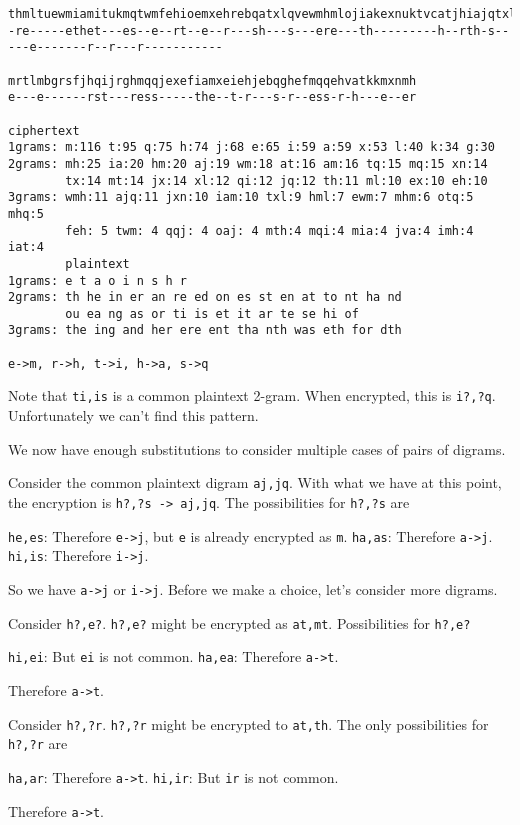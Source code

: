 \begin{Verbatim}[frame=single,fontsize=\tiny]
thmltuewmiamitukmqtwmfehioemxehrebqatxlqvewmhmlojiakexnuktvcatjhiajqtxltumkkeojxnhethjxnhbrukjxnwejv
-re-----ethet---es--e--rt--e--r---sh---s---ere---th---------h--rth-s-----e-------r--r---r-----------

mrtlmbgrsfjhqijrghmqqjexefiamxeiehjebqghefmqqehvatkkmxnmh
e---e------rst---ress-----the--t-r---s-r--ess-r-h---e--er

ciphertext
1grams: m:116 t:95 q:75 h:74 j:68 e:65 i:59 a:59 x:53 l:40 k:34 g:30
2grams: mh:25 ia:20 hm:20 aj:19 wm:18 at:16 am:16 tq:15 mq:15 xn:14
        tx:14 mt:14 jx:14 xl:12 qi:12 jq:12 th:11 ml:10 ex:10 eh:10
3grams: wmh:11 ajq:11 jxn:10 iam:10 txl:9 hml:7 ewm:7 mhm:6 otq:5 mhq:5
        feh: 5 twm: 4 qqj: 4 oaj: 4 mth:4 mqi:4 mia:4 jva:4 imh:4 iat:4
        plaintext
1grams: e t a o i n s h r
2grams: th he in er an re ed on es st en at to nt ha nd
        ou ea ng as or ti is et it ar te se hi of
3grams: the ing and her ere ent tha nth was eth for dth

e->m, r->h, t->i, h->a, s->q
\end{Verbatim}

Note that \verb!ti,is! is a common plaintext 2-gram.
When encrypted, this is \verb!i?,?q!.
Unfortunately we can't find this pattern.

We now have enough substitutions to consider multiple cases of pairs of digrams.

Consider the common plaintext digram \verb!aj,jq!.
With what we have at this point, the encryption is
\verb!h?,?s -> aj,jq!.
The possibilities for
\verb!h?,?s! are
\begin{tightlist}
 \li \verb!he,es!: Therefore \verb!e->j!, but \verb!e! is already encrypted as \verb!m!.
 \li \verb!ha,as!: Therefore \verb!a->j!.
 \li \verb!hi,is!: Therefore \verb!i->j!.
\end{tightlist}
So we have \verb!a->j! or \verb!i->j!.
Before we make a choice, let's consider more digrams.

Consider \verb!h?,e?!. \verb!h?,e?! might be encrypted as \verb!at,mt!.
Possibilities for \verb!h?,e?!
\begin{tightlist}
  \li \verb!hi,ei!: But \verb!ei! is not common.
  \li \verb!ha,ea!: Therefore \verb!a->t!. 
\end{tightlist}
Therefore \verb!a->t!.

Consider \verb!h?,?r!.
\verb!h?,?r! might be encrypted to \verb!at,th!.
The only possibilities for \verb!h?,?r! are
\begin{tightlist}
  \li \verb!ha,ar!: Therefore \verb!a->t!.
  \li \verb!hi,ir!: But \verb!ir! is not common.
\end{tightlist}
Therefore \verb!a->t!.

